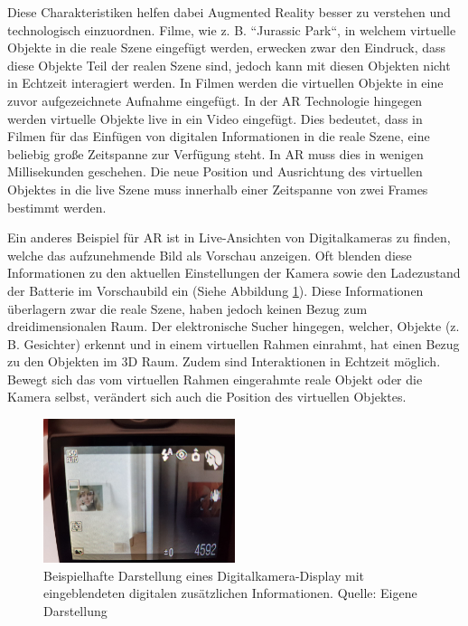 Diese Charakteristiken helfen dabei Augmented Reality besser zu verstehen und technologisch einzuordnen. \cite{Azuma1997} Filme, wie z. B. ``Jurassic Park``, in welchem virtuelle Objekte in die reale Szene eingefügt werden, erwecken zwar den Eindruck, dass diese Objekte Teil der realen Szene sind, jedoch kann mit diesen Objekten nicht in Echtzeit interagiert werden. \cite{Tonnis2010} In Filmen werden die virtuellen Objekte in eine zuvor aufgezeichnete Aufnahme eingefügt. 
In der AR Technologie hingegen werden virtuelle Objekte live in ein Video eingefügt. Dies bedeutet, dass in  Filmen für das Einfügen von digitalen Informationen in die reale Szene, eine beliebig große Zeitspanne zur Verfügung steht. 
In AR muss dies in wenigen Millisekunden geschehen. Die neue Position und Ausrichtung des virtuellen Objektes in die live Szene muss innerhalb einer Zeitspanne von zwei Frames bestimmt werden.

Ein anderes Beispiel für AR ist in Live-Ansichten von Digitalkameras zu finden, welche das aufzunehmende Bild als Vorschau anzeigen. Oft blenden diese Informationen zu den aktuellen Einstellungen der Kamera sowie den 
Ladezustand der Batterie im Vorschaubild ein (Siehe Abbildung \ref{img:ar_camera_example}). Diese Informationen überlagern zwar die reale Szene, haben jedoch keinen Bezug zum dreidimensionalen Raum. 
Der elektronische Sucher hingegen, welcher, Objekte (z. B. Gesichter) erkennt und in einem virtuellen Rahmen einrahmt, hat einen Bezug zu den Objekten im 3D Raum. 
Zudem sind Interaktionen in Echtzeit möglich. Bewegt sich das vom virtuellen Rahmen eingerahmte reale Objekt oder die Kamera selbst, verändert sich auch die Position des virtuellen Objektes. 

\begin{figure}
	\centering
	\includegraphics[width=0.50\textwidth]{resources/fundamentals/example_camera_screen_ar}
	\caption{Beispielhafte Darstellung eines Digitalkamera-Display mit eingeblendeten digitalen zusätzlichen Informationen. Quelle: Eigene Darstellung}
	\label{img:ar_camera_example}
\end{figure}

